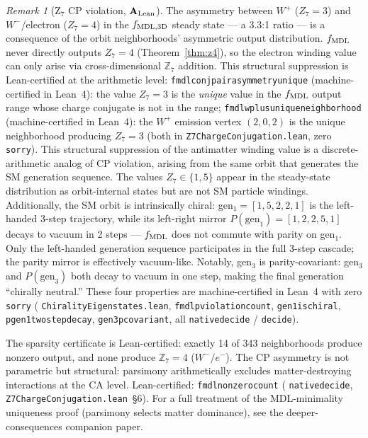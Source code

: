 \documentclass[11pt]{article}
\theoremstyle{remark}
\newtheorem{remark}[theorem]{Remark}
\newcommand{\lean}[1]{%
  \penalty-100
  \begingroup\def\_{\textunderscore\allowbreak}\texttt{#1}\endgroup}
\newcommand{\CatAL}{\ensuremath{\textbf{A}_{\rm Lean}}}
\begin{document}
\begin{remark}[Z$_7$ CP violation, $\CatAL$]
The asymmetry between $W^+$ ($Z_7 = 3$) and $W^-$/electron ($Z_7 = 4$) in the
$f_{\rm MDL, 3D}$ steady state --- a 3.3:1 ratio --- is a consequence of the orbit
neighborhoods' asymmetric output distribution.
$f_{\rm MDL}$ never directly outputs $Z_7 = 4$ (Theorem~\ref{thm:z4}), so the electron
winding value can only arise via cross-dimensional $\mathbb{Z}_7$ addition.
This structural suppression is Lean-certified at the arithmetic level:
\lean{fmdl\_conj\_pair\_asymmetry\_unique} (machine-certified in Lean~4): the value $Z_7=3$ is the
\emph{unique} value in the $f_{\rm MDL}$ output range whose charge conjugate is not in
the range;
\lean{fmdl\_w\_plus\_unique\_neighborhood} (machine-certified in Lean~4): the $W^+$ emission vertex $(2,0,2)$
is the unique neighborhood producing $Z_7=3$
(both in \lean{Z7Charge\-Conjugation.lean}, zero \texttt{sorry}).
This structural suppression of the antimatter winding value is a discrete-arithmetic
analog of CP violation, arising from the same orbit that generates the SM generation sequence.
The values $Z_7 \in \{1,5\}$ appear in the steady-state distribution as orbit-internal
states but are not SM particle windings.
Additionally, the SM orbit is intrinsically chiral: gen$_1 = [1,5,2,2,1]$ is the
left-handed 3-step trajectory, while its left-right mirror $P(\text{gen}_1) = [1,2,2,5,1]$
decays to vacuum in 2 steps --- $f_{\rm MDL}$ does not commute with parity on gen$_1$.
Only the left-handed generation sequence participates in the full 3-step cascade; the
parity mirror is effectively vacuum-like.
Notably, gen$_3$ is parity-covariant: gen$_3$ and $P(\text{gen}_3)$ both decay to
vacuum in one step, making the final generation ``chirally neutral.''
These four properties are machine-certified in Lean~4 with zero \texttt{sorry}
(\lean{Chirality\allowbreak{}Eigenstates\allowbreak.lean},
\lean{fmdl\_p\_violation\_count}, \lean{gen1\_is\_chiral},
\lean{p\_gen1\_two\_step\_decay}, \lean{gen3\_p\_covariant},
all \lean{native\_decide} / \lean{decide}).

The sparsity certificate is Lean-certified: exactly 14 of 343 neighborhoods produce
nonzero output, and none produce $\mathbb{Z}_7 = 4$ ($W^-/e^-$). The CP asymmetry
is not parametric but structural: parsimony arithmetically excludes matter-destroying
interactions at the CA level.
Lean-certified: \lean{fmdl\_nonzero\_count\_14} (\lean{native\_decide},
\lean{Z7Charge\-Conjugation.lean}~\S6).
For a full treatment of the MDL-minimality uniqueness proof (parsimony selects matter dominance),
see the deeper-consequences companion paper.
\end{remark}
\end{document}
